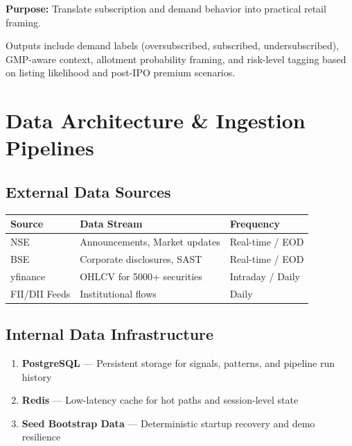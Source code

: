 \documentclass[11pt,a4paper]{article}
\begin{document}
\textbf{Purpose:} Translate subscription and demand behavior into practical retail framing.

\vspace{0.3cm}

Outputs include demand labels (oversubscribed, subscribed, undersubscribed), GMP-aware context, allotment probability framing, and risk-level tagging based on listing likelihood and post-IPO premium scenarios.

\section{Data Architecture \& Ingestion Pipelines}

\subsection{External Data Sources}

\begin{tcolorbox}[colback=mn-light, colframe=mn-slate, arc=1mm, boxsep=8pt]
\small

\begin{tabular}{|p{2cm}|p{3.5cm}|p{2cm}|}
\hline
\rowcolor{mn-slate!20}
\textbf{Source} & \textbf{Data Stream} & \textbf{Frequency} \\
\hline
NSE & Announcements, Market updates & Real-time / EOD \\
\hline
BSE & Corporate disclosures, SAST & Real-time / EOD \\
\hline
yfinance & OHLCV for 5000+ securities & Intraday / Daily \\
\hline
FII/DII Feeds & Institutional flows & Daily \\
\hline
\end{tabular}

\end{tcolorbox}

\subsection{Internal Data Infrastructure}

\begin{enumerate}[label={\color{mn-blue}\textbf{Tier \Roman*}}, leftmargin=1.8cm]
    \item \textbf{PostgreSQL} — Persistent storage for signals, patterns, and pipeline run history
    \item \textbf{Redis} — Low-latency cache for hot paths and session-level state
    \item \textbf{Seed Bootstrap Data} — Deterministic startup recovery and demo resilience
\end{enumerate}
\end{document}

